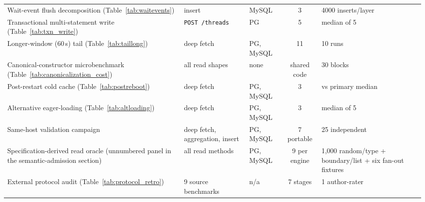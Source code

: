 \documentclass[11pt,a4paper]{article}
\begin{document}
{\begin{longtable}{@{}p{} p{} p{} c p{}@{}}
    Wait-event flush decomposition (Table~\ref{tab:waitevents}) & insert & MySQL & 3 & 4000 inserts/layer \\
    Transactional multi-statement write (Table~\ref{tab:txn_write}) & \texttt{POST /threads} & PG & 5 & median of 5 \\
    Longer-window (60\,s) tail (Table~\ref{tab:taillong}) & deep fetch & PG, MySQL & 11 & 10 runs \\
    Canonical-constructor microbenchmark (Table~\ref{tab:canonicalization_cost}) & all read shapes & none & shared code & 30 blocks \\
    Post-restart cold cache (Table~\ref{tab:postreboot}) & deep fetch & PG, MySQL & 3 & vs primary median \\
    Alternative eager-loading (Table~\ref{tab:altloading}) & deep fetch & PG, MySQL & 3 & median of 5 \\
    Same-host validation campaign & deep fetch, aggregation, insert & PG, MySQL & 7 portable & 25 independent \\
    Specification-derived read oracle (unnumbered panel in the semantic-admission section) & all read methods & PG, MySQL & 9 per engine & 1,000 random/type + boundary/list + six fan-out fixtures \\
    External protocol audit (Table~\ref{tab:protocol_retro}) & 9 source benchmarks & n/a & 7 stages & 1 author-rater \\
    \bottomrule
  \end{longtable}
}
\end{document}
